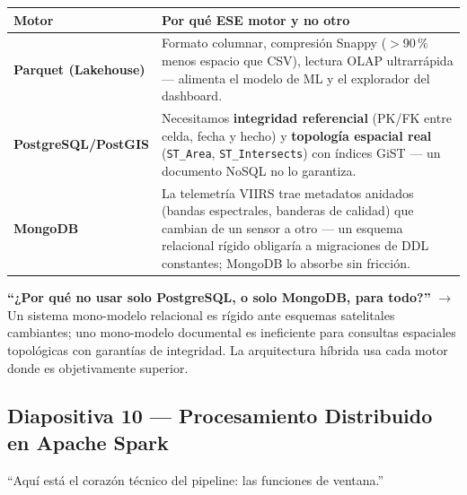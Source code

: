 \documentclass[11pt,a4paper]{article}
\begin{document}
\begin{table}[H]
\centering
\small
\begin{tabularx}{\textwidth}{@{}lX@{}}
\toprule
\textbf{Motor} & \textbf{Por qu\'e ESE motor y no otro} \\
\midrule
\textbf{Parquet (Lakehouse)} & Formato columnar, compresi\'on Snappy ($>$90\,\% menos espacio que CSV), lectura OLAP ultrarr\'apida --- alimenta el modelo de ML y el explorador del dashboard. \\
\textbf{PostgreSQL/PostGIS} & Necesitamos \textbf{integridad referencial} (PK/FK entre celda, fecha y hecho) y \textbf{topolog\'ia espacial real} (\texttt{ST\_Area}, \texttt{ST\_Intersects}) con \'indices GiST --- un documento NoSQL no lo garantiza. \\
\textbf{MongoDB} & La telemetr\'ia VIIRS trae metadatos anidados (bandas espectrales, banderas de calidad) que cambian de un sensor a otro --- un esquema relacional r\'igido obligar\'ia a migraciones de DDL constantes; MongoDB lo absorbe sin fricci\'on. \\
\bottomrule
\end{tabularx}
\end{table}

\begin{alertabox}
\textbf{``¿Por qu\'e no usar solo PostgreSQL, o solo MongoDB, para todo?''} $\to$ Un sistema mono-modelo relacional es r\'igido ante esquemas satelitales cambiantes; uno mono-modelo documental es ineficiente para consultas espaciales topol\'ogicas con garant\'ias de integridad. La arquitectura h\'ibrida usa cada motor donde es objetivamente superior.
\end{alertabox}

\subsection{Diapositiva 10 --- Procesamiento Distribuido en Apache Spark}

\begin{decirbox}
``Aqu\'i est\'a el coraz\'on t\'ecnico del pipeline: las funciones de ventana.''
\end{decirbox}
\end{document}
